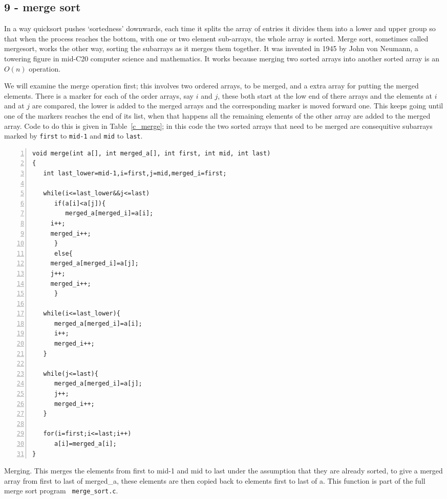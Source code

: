 \documentclass[11pt,a4paper]{scrartcl}
\begin{document}
\subsection*{9 - merge sort}

In a way quicksort pushes \lq{}sortedness\rq{} downwards, each time it
splits the array of entries it divides them into a lower and upper
group so that when the process reaches the bottom, with one or two
element sub-arrays, the whole array is sorted. Merge sort, sometimes
called mergesort, works the other way, sorting the subarrays as it
merges them together. It was invented in 1945 by John von Neumann, a towering
figure in mid-C20 computer science and mathematics. It works because
merging two sorted arrays into another sorted array is an $O(n)$
operation.

We will examine the merge operation first; this involves two ordered
arrays, to be merged, and a extra array for putting the merged
elements. There is a marker for each of the order arrays, say $i$ and
$j$, these both start at the low end of there arrays and the elements
at $i$ and at $j$ are compared, the lower is added to the merged
arrays and the corresponding marker is moved forward one. This keeps
going until one of the markers reaches the end of its list, when that
happens all the remaining elements of the other array are added to the
merged array. Code to do this is given in Table~\ref{c_merge}; in this
code the two sorted arrays that need to be merged are consequitive
subarrays marked by \texttt{first} to \texttt{mid-1} and \texttt{mid} to \texttt{last}.


\begin{table}
\begin{lstlisting}[numbers=left]
void merge(int a[], int merged_a[], int first, int mid, int last)
{
   int last_lower=mid-1,i=first,j=mid,merged_i=first;

   while(i<=last_lower&&j<=last)
      if(a[i]<a[j]){
         merged_a[merged_i]=a[i];
	 i++;
	 merged_i++;
      }
      else{
	 merged_a[merged_i]=a[j];
	 j++;
	 merged_i++;
      }

   while(i<=last_lower){
      merged_a[merged_i]=a[i];
      i++;
      merged_i++;
   }

   while(j<=last){
      merged_a[merged_i]=a[j];
      j++;
      merged_i++;
   }

   for(i=first;i<=last;i++)
      a[i]=merged_a[i];
}
\end{lstlisting}
\caption{Merging. This merges the elements from first to mid-1 and mid
  to last under the assumption that they are already sorted, to give a
  merged array from first to last of merged\_a, these elements are
  then copied back to elements first to last of a. This function is
  part of the full merge sort program \texttt{
    merge\_sort.c}. \label{c_merge}}
\end{table}
\end{document}
